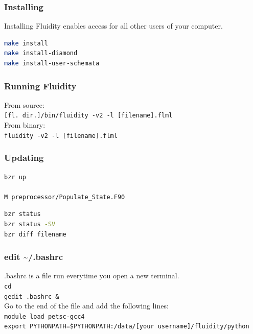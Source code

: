 \documentclass[12pt]{beamer}
\begin{document}
\begin{frame}[fragile]
        \frametitle{Installing}
\lstset{language=bash}
Installing Fluidity enables access for all other users of your computer.
\begin{lstlisting}[language=bash,basicstyle=\ttfamily]
make install
make install-diamond
make install-user-schemata
\end{lstlisting}
\end{frame}

\begin{frame}
    \frametitle{Running Fluidity}
From source:    
\\ \texttt{[fl. dir.]/bin/fluidity -v2 -l [filename].flml}
\\ [0.5cm]
From binary:    
\\ \texttt{fluidity -v2 -l [filename].flml}
\end{frame}

\begin{frame}[fragile]
        \frametitle{Updating}
\lstset{language=bash}
\begin{lstlisting}[language=bash,basicstyle=\ttfamily]
bzr up
    
M preprocessor/Populate_State.F90
\end{lstlisting}

\begin{lstlisting}[language=bash,basicstyle=\ttfamily]
bzr status
bzr status -SV
bzr diff filename
\end{lstlisting}
\end{frame}

\begin{frame}[fragile]
    \frametitle{edit \textasciitilde /.bashrc}
.bashrc is a file run everytime you open a new terminal.
\\ \vspace{10pt}
\texttt{cd}
\\ \texttt{gedit .bashrc \&}
\\ \vspace{10pt}
Go to the end of the file and add the following lines:
\\ \vspace{10pt}
\texttt{module load petsc-gcc4}
\\ \texttt{export PYTHONPATH=\$PYTHONPATH:/data/[your username]/fluidity/python}

\end{frame}
\end{document}
